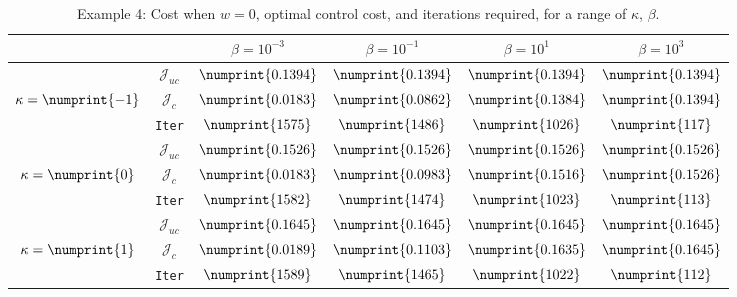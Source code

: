\begin{table}
\begin{tabular}{ | c | c || c | c | c | c ||}
\hline
\multicolumn{2}{|c||}{}& $\beta = 10^{-3}$ & $\beta = 10^{-1}$ & $\beta = 10^{1}$ & $\beta = 10^{3}$  \\
\hline
\hline
 & $\mathcal{J}_{uc}$ & $\numprint{0.1394}$ & $\numprint{0.1394}$ & $\numprint{0.1394}$ & $\numprint{0.1394}$ \\
$\kappa= \numprint{-1}$  & $\mathcal{J}_c$ & $\numprint{0.0183}$ & $\numprint{0.0862}$ & $\numprint{0.1384}$ & $\numprint{0.1394}$ \\
& \texttt{Iter} & $\numprint{1575}$ & $\numprint{1486}$ & $\numprint{1026}$ & $\numprint{117}$ \\
\hline
 & $\mathcal{J}_{uc}$ & $\numprint{0.1526}$ & $\numprint{0.1526}$ & $\numprint{0.1526}$ & $\numprint{0.1526}$ \\
$\kappa= \numprint{0}$  & $\mathcal{J}_c$ & $\numprint{0.0183}$ & $\numprint{0.0983}$ & $\numprint{0.1516}$ & $\numprint{0.1526}$ \\
& \texttt{Iter} & $\numprint{1582}$ & $\numprint{1474}$ & $\numprint{1023}$ & $\numprint{113}$ \\
\hline
 & $\mathcal{J}_{uc}$ & $\numprint{0.1645}$ & $\numprint{0.1645}$ & $\numprint{0.1645}$ & $\numprint{0.1645}$ \\
$\kappa= \numprint{1}$  & $\mathcal{J}_c$ & $\numprint{0.0189}$ & $\numprint{0.1103}$ & $\numprint{0.1635}$ & $\numprint{0.1645}$ \\
& \texttt{Iter} & $\numprint{1589}$ & $\numprint{1465}$ & $\numprint{1022}$ & $\numprint{112}$ \\
\hline
\end{tabular}
\caption{Example 4: Cost when $w=0$, optimal control cost, and iterations required, for a range of $\kappa$, $\beta$.}
\label{TabS5:Prob4}
\end{table}